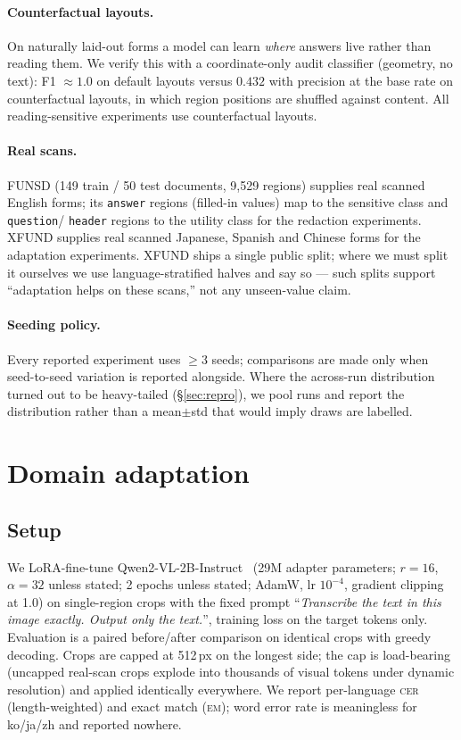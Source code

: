 \documentclass[11pt]{article}
\newcommand{\cer}{\textsc{cer}}
\newcommand{\EM}{\textsc{em}}
\begin{document}
\paragraph{Counterfactual layouts.} On naturally laid-out forms a model can
learn \emph{where} answers live rather than reading them. We verify this
with a coordinate-only audit classifier (geometry, no text): F1 $\approx
1.0$ on default layouts versus $0.432$ with precision at the base rate on
counterfactual layouts, in which region positions are shuffled against
content. All reading-sensitive experiments use counterfactual layouts.

\paragraph{Real scans.} FUNSD (149 train / 50 test documents, 9{,}529
regions) supplies real scanned English forms; its \texttt{answer} regions
(filled-in values) map to the sensitive class and \texttt{question}/%
\texttt{header} regions to the utility class for the redaction experiments.
XFUND supplies real scanned Japanese, Spanish and Chinese forms for the
adaptation experiments. XFUND ships a single public split; where we must
split it ourselves we use language-stratified halves and say so --- such
splits support ``adaptation helps on these scans,'' not any unseen-value
claim.

\paragraph{Seeding policy.} Every reported experiment uses $\geq 3$ seeds;
comparisons are made only when seed-to-seed variation is reported alongside.
Where the across-run distribution turned out to be heavy-tailed
(\S\ref{sec:repro}), we pool runs and report the distribution rather than a
mean$\pm$std that would imply draws are labelled.

\section{Domain adaptation}\label{sec:adapt}

\subsection{Setup}

We LoRA-fine-tune Qwen2-VL-2B-Instruct~\cite{wang2024qwen2vl} (29M adapter
parameters; $r{=}16$, $\alpha{=}32$ unless stated; 2 epochs unless stated;
AdamW, lr $10^{-4}$, gradient clipping at 1.0) on single-region crops with
the fixed prompt ``\emph{Transcribe the text in this image exactly. Output
only the text.}'', training loss on the target tokens only. Evaluation is a
paired before/after comparison on identical crops with greedy decoding.
Crops are capped at 512\,px on the longest side; the cap is load-bearing
(uncapped real-scan crops explode into thousands of visual tokens under
dynamic resolution) and applied identically everywhere. We report
per-language \cer{} (length-weighted) and exact match (\EM{}); word error
rate is meaningless for ko/ja/zh and reported nowhere.
\end{document}

